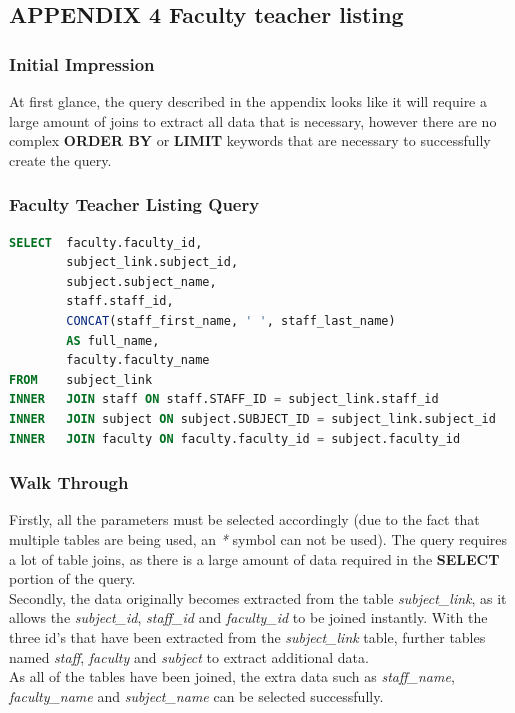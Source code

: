 \documentclass{article}
\begin{document}
\subsection{APPENDIX 4 Faculty teacher listing}
\subsubsection{Initial Impression} At first glance, the query described in the appendix looks like it will require a large amount of joins to extract all data that is necessary, however there are no complex \textbf{ORDER BY} or \textbf{LIMIT} keywords that are necessary to successfully create the query.

\subsubsection{Faculty Teacher Listing Query}
\begin{lstlisting}[language=sql, caption=Faculty Teacher Listing Query, style=mystyle]
SELECT  faculty.faculty_id, 
        subject_link.subject_id, 
        subject.subject_name, 
        staff.staff_id, 
        CONCAT(staff_first_name, ' ', staff_last_name) 
        AS full_name, 
        faculty.faculty_name 
FROM    subject_link
INNER   JOIN staff ON staff.STAFF_ID = subject_link.staff_id
INNER   JOIN subject ON subject.SUBJECT_ID = subject_link.subject_id
INNER   JOIN faculty ON faculty.faculty_id = subject.faculty_id
\end{lstlisting}

\subsubsection{Walk Through} Firstly, all the parameters must be selected accordingly (due to the fact that multiple tables are being used, an \textit{*} symbol can not be used). The query requires a lot of table joins, as there is a large amount of data required in the \textbf{SELECT} portion of the query.
\\\newline
Secondly, the data originally becomes extracted from the table \textit{subject\_link}, as it allows the \textit{subject\_id}, \textit{staff\_id} and \textit{faculty\_id} to be joined instantly. With the three id's that have been extracted from the \textit{subject\_link} table, further tables named \textit{staff}, \textit{faculty} and \textit{subject} to extract additional data.
\\\newline
As all of the tables have been joined, the extra data such as \textit{staff\_name}, \textit{faculty\_name} and \textit{subject\_name} can be selected successfully.
\end{document}
